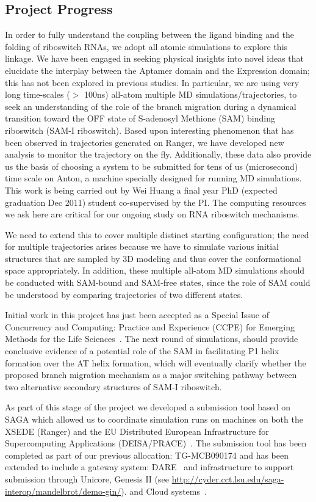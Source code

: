 \documentclass[a4paper,11pt]{article}
\begin{document}
\subsection{Project Progress}
In order to fully understand the coupling between the ligand binding
and the folding of riboswitch RNAs, we adopt all atomic simulations to
explore this linkage.  We have been engaged in seeking physical
insights into novel ideas that elucidate the interplay between the
Aptamer domain and the Expression domain; this has not been explored
in previous studies.  In particular, we are using very long
time-scales ($>$ 100ns) all-atom multiple MD simulations/trajectories,
to seek an understanding of the role of the branch migration during a
dynamical transition toward the OFF state of S-adenosyl Methione (SAM)
binding riboswitch (SAM-I riboswitch).  Based upon interesting
phenomenon that has been observed in trajectories generated on Ranger,
we have developed new analysis to monitor the trajectory on the
fly. Additionally, these data also provide us the basis of choosing a
system to be submitted for tens of us (microsecond) time scale on
Anton, a machine specially designed for running MD simulations. This
work is being carried out by Wei Huang a final year PhD (expected
graduation Dec 2011) student co-supervised by the PI.  The computing
resources we ask here are critical for our ongoing study on RNA
riboswitch mechanisms.

We need to extend this to cover multiple distinct starting
configuration; the need for multiple trajectories arises because we
have to simulate various initial structures that are sampled by 3D
modeling and thus cover the conformational space appropriately.  In
addition, these multiple all-atom MD simulations should be conducted
with SAM-bound and SAM-free states, since the role of SAM could be
understood by comparing trajectories of two different states.  

Initial work in this project has just been accepted as a Special Issue
of Concurrency and Computing: Practice and Experience (CCPE) for
Emerging Methods for the Life Sciences~\cite{ccpe10}.  The next round
of simulations, should provide conclusive evidence of a potential role
of the SAM in facilitating P1 helix formation over the AT helix
formation, which will eventually clarify whether the proposed branch
migration mechanism as a major switching pathway between two
alternative secondary structures of SAM-I riboswitch.

As part of this stage of the project we developed a submission tool
based on SAGA which allowed us to coordinate simulation runs on
machines on both the XSEDE (Ranger) and the EU Distributed European
Infrastructure for Supercomputing Applications
(DEISA/PRACE)~\cite{DEISA-PRACE}. The submission tool has been completed as part
of our previous allocation: TG-MCB090174 and has been extended to
include a gateway system: DARE~\cite{dare-tg11} and infrastructure to
support submission through Unicore, Genesis II (see
\url{http://cyder.cct.lsu.edu/saga-interop/mandelbrot/demo-gin/}).
and Cloud systems~\cite{pstar}.
\end{document}
